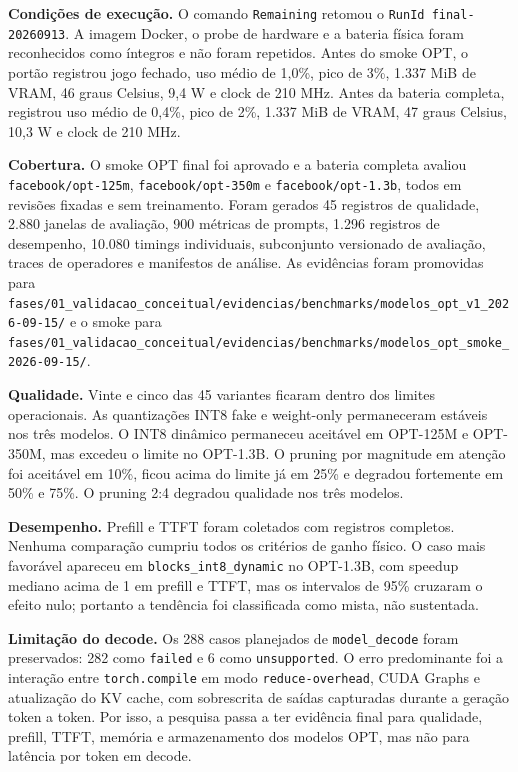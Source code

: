 \textbf{Condições de execução.} O comando \texttt{Remaining} retomou o
\texttt{RunId final-20260913}. A imagem Docker, o probe de hardware e a bateria
física foram reconhecidos como íntegros e não foram repetidos. Antes do smoke
OPT, o portão registrou jogo fechado, uso médio de 1,0\%, pico de 3\%, 1.337 MiB
de VRAM, 46 graus Celsius, 9,4 W e clock de 210 MHz. Antes da bateria completa,
registrou uso médio de 0,4\%, pico de 2\%, 1.337 MiB de VRAM, 47 graus Celsius,
10,3 W e clock de 210 MHz.

\textbf{Cobertura.} O smoke OPT final foi aprovado e a bateria completa avaliou
\texttt{facebook/opt-125m}, \texttt{facebook/opt-350m} e
\texttt{facebook/opt-1.3b}, todos em revisões fixadas e sem treinamento. Foram
gerados 45 registros de qualidade, 2.880 janelas de avaliação, 900 métricas de
prompts, 1.296 registros de desempenho, 10.080 timings individuais, subconjunto
versionado de avaliação, traces de operadores e manifestos de análise. As
evidências foram promovidas para
\texttt{fases/01\_\allowbreak{}validacao\_\allowbreak{}conceitual/\allowbreak{}evidencias/\allowbreak{}benchmarks/\allowbreak{}modelos\_\allowbreak{}opt\_\allowbreak{}v1\_\allowbreak{}2026-09-15/}
e o smoke para
\texttt{fases/01\_\allowbreak{}validacao\_\allowbreak{}conceitual/\allowbreak{}evidencias/\allowbreak{}benchmarks/\allowbreak{}modelos\_\allowbreak{}opt\_\allowbreak{}smoke\_\allowbreak{}2026-09-15/}.

\textbf{Qualidade.} Vinte e cinco das 45 variantes ficaram dentro dos limites
operacionais. As quantizações INT8 fake e weight-only permaneceram estáveis nos
três modelos. O INT8 dinâmico permaneceu aceitável em OPT-125M e OPT-350M, mas
excedeu o limite no OPT-1.3B. O pruning por magnitude em atenção foi aceitável
em 10\%, ficou acima do limite já em 25\% e degradou fortemente em 50\% e 75\%.
O pruning 2:4 degradou qualidade nos três modelos.

\textbf{Desempenho.} Prefill e TTFT foram coletados com registros completos.
Nenhuma comparação cumpriu todos os critérios de ganho físico. O caso mais
favorável apareceu em \texttt{blocks\_\allowbreak{}int8\_\allowbreak{}dynamic}
no OPT-1.3B, com speedup mediano acima de 1 em prefill e TTFT, mas os intervalos
de 95\% cruzaram o efeito nulo; portanto a tendência foi classificada como
mista, não sustentada.

\textbf{Limitação do decode.} Os 288 casos planejados de
\texttt{model\_\allowbreak{}decode} foram preservados: 282 como
\texttt{failed} e 6 como \texttt{unsupported}. O erro predominante foi a
interação entre \texttt{torch.compile} em modo \texttt{reduce-overhead}, CUDA
Graphs e atualização do KV cache, com sobrescrita de saídas capturadas durante a
geração token a token. Por isso, a pesquisa passa a ter evidência final para
qualidade, prefill, TTFT, memória e armazenamento dos modelos OPT, mas não para
latência por token em decode.


